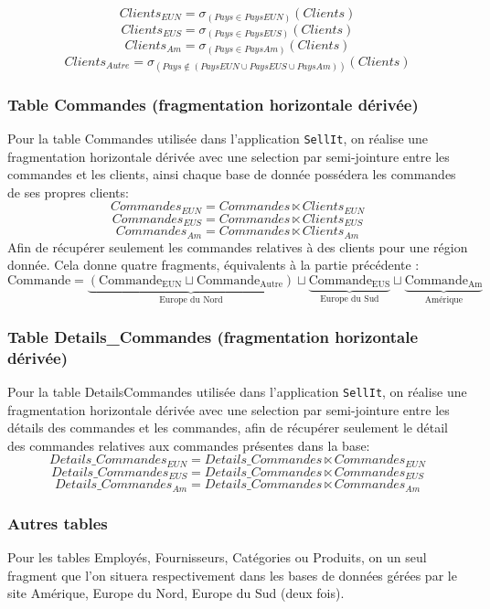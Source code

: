 \documentclass[10pt,a4paper]{article}
\theoremstyle{plain}
\begin{document}
\[Clients_{EUN} = \sigma_{(Pays \in PaysEUN)}(Clients)\]
\[Clients_{EUS} = \sigma_{(Pays \in PaysEUS)}(Clients)\]
\[Clients_{Am} = \sigma_{(Pays \in PaysAm)}(Clients)\]
\[Clients_{Autre} = \sigma_{(Pays \not\in (PaysEUN \cup PaysEUS \cup PaysAm))}(Clients)\]

\subsubsection{Table Commandes (fragmentation horizontale dérivée)}
Pour la table Commandes utilisée dans l'application \verb|SellIt|, on réalise une fragmentation horizontale dérivée avec une selection par semi-jointure entre les commandes et les clients, ainsi chaque base de donnée possédera les commandes de ses propres clients:
\[Commandes_{EUN} = Commandes \ltimes Clients_{EUN}\]
\[Commandes_{EUS} = Commandes \ltimes Clients_{EUS}\]
\[Commandes_{Am} = Commandes \ltimes Clients_{Am}\]
Afin de récupérer seulement les commandes relatives à des clients pour une région donnée. Cela donne quatre fragments, équivalents à la partie précédente :
\[\text{Commande}=\underbrace{(\text{Commande}_{\text{EUN}}\sqcup\text{Commande}_{\text{Autre}})}_{\text{Europe du Nord}}\sqcup\underbrace{\text{Commande}_{\text{EUS}}}_{\text{Europe du Sud}}\sqcup\underbrace{\text{Commande}_{\text{Am}}}_{\text{Amérique}}\]

\subsubsection{Table Details\_Commandes (fragmentation horizontale dérivée)}
Pour la table DetailsCommandes utilisée dans l'application \verb|SellIt|, on réalise une fragmentation horizontale dérivée avec une selection par semi-jointure entre les détails des commandes et les commandes, afin de récupérer seulement le détail des commandes relatives aux commandes présentes dans la base:
\[Details\_Commandes_{EUN} = Details\_Commandes \ltimes Commandes_{EUN}\]
\[Details\_Commandes_{EUS} = Details\_Commandes \ltimes Commandes_{EUS}\]
\[Details\_Commandes_{Am} = Details\_Commandes \ltimes Commandes_{Am}\]

\subsubsection{Autres tables}
Pour les tables Employés, Fournisseurs, Catégories ou Produits, on un seul fragment que l'on situera respectivement dans les bases de données gérées par le site Amérique, Europe du Nord, Europe du Sud (deux fois).
\end{document}
